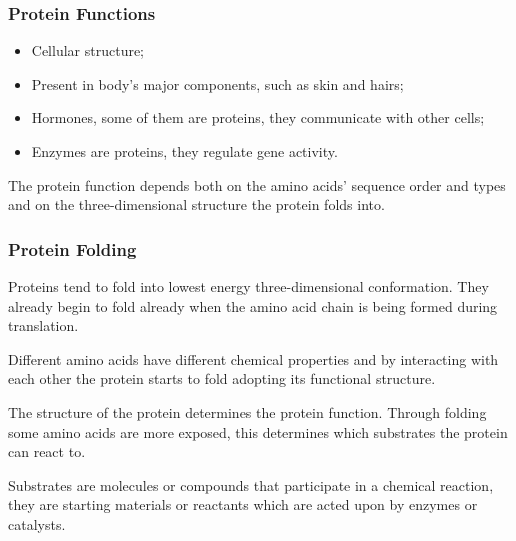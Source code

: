 \subsubsection{Protein Functions}
\begin{itemize}
	\item Cellular structure;
	\item Present in body's major components, such as skin and hairs;
	\item Hormones, some of them are proteins, they communicate with other cells;
	\item Enzymes are proteins, they regulate gene activity.
\end{itemize}

The protein function depends both on the amino acids' sequence order and types and on the three-dimensional structure the protein folds into.

\subsubsection{Protein Folding}
Proteins tend to fold into lowest energy three-dimensional conformation. They already begin to fold already when the amino acid chain is being formed during translation.

Different amino acids have different chemical properties and by interacting with each other the protein starts to fold adopting its functional structure.

The structure of the protein determines the protein function. Through folding some amino acids are more exposed, this determines which substrates the protein can react to.

Substrates are molecules or compounds that participate in a chemical reaction, they are starting materials or reactants which are acted upon by enzymes or catalysts.
\vspace{6em}
\pagebreak

